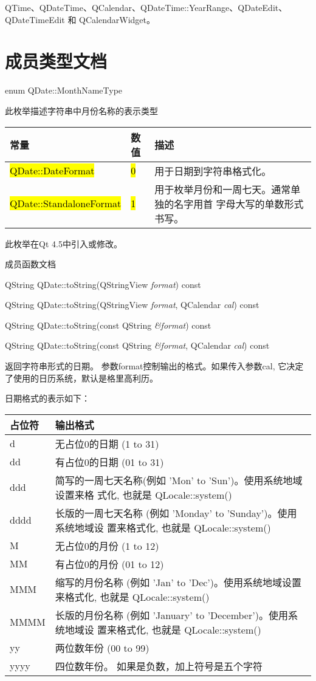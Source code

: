 \begin{seeAlso}
QTime、QDateTime、QCalendar、QDateTime::YearRange、QDateEdit、QDateTimeEdit 和 QCalendarWidget。
\end{seeAlso}


\splitLine

\section{成员类型文档}

enum QDate::MonthNameType

此枚举描述字符串中月份名称的表示类型

\begin{tabular}{|l|l|m{20em}|}
\hline
常量	&数值&	描述\\
\hline
\hl{QDate::DateFormat}&	\hl{0}&	用于日期到字符串格式化。\\
\hline
\hl{QDate::StandaloneFormat}	&\hl{1}&	用于枚举月份和一周七天。通常单独的名字用首
  字母大写的单数形式书写。\\
\hline
\end{tabular}

此枚举在Qt 4.5中引入或修改。

\splitLine

成员函数文档

QString QDate::toString(QStringView \emph{format}) const

QString QDate::toString(QStringView \emph{format}, QCalendar \emph{cal}) const

QString QDate::toString(const QString \emph{\&format}) const

QString QDate::toString(const QString \emph{\&format}, QCalendar \emph{cal}) const

返回字符串形式的日期。 参数format控制输出的格式。如果传入参数cal, 它决定了使用的日历系统，默认是格里高利历。

日期格式的表示如下：

\begin{tabular}{|l|m{30em}|}
\hline
占位符 &	输出格式\\
\hline
d&	无占位0的日期 (1 to 31)\\
\hline
dd&	有占位0的日期 (01 to 31)\\
\hline
ddd&	简写的一周七天名称(例如 'Mon' to 'Sun')。使用系统地域设置来格
     式化, 也就是 QLocale::system()\\
\hline
dddd&	长版的一周七天名称 (例如 'Monday' to 'Sunday')。使用系统地域设
      置来格式化, 也就是 QLocale::system()\\
\hline
M&	无占位0的月份 (1 to 12)\\
\hline
MM&	有占位0的月份 (01 to 12)\\
\hline
MMM&	缩写的月份名称 (例如 'Jan' to 'Dec')。使用系统地域设置来格式化,
     也就是 QLocale::system()\\
\hline
MMMM&	长版的月份名称 (例如 'January' to 'December')。使用系统地域设
      置来格式化, 也就是 QLocale::system()\\
\hline
yy&	两位数年份 (00 to 99)\\
\hline
yyyy&	四位数年份。 如果是负数，加上符号是五个字符\\
\hline
\end{tabular}


